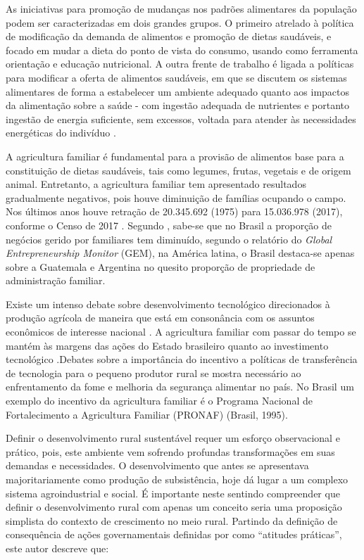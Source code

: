 As iniciativas para promoção de mudanças nos padrões alimentares da população podem ser caracterizadas em dois grandes grupos. O primeiro atrelado à política de modificação da demanda de alimentos e promoção de dietas saudáveis, e focado em mudar a dieta do ponto de vista do consumo, usando como ferramenta orientação e educação nutricional. A outra frente de trabalho é ligada a políticas para modificar a oferta de alimentos saudáveis, em que se discutem os sistemas alimentares de forma a estabelecer um ambiente adequado quanto aos impactos da alimentação sobre a saúde - com ingestão adequada de nutrientes e portanto ingestão de energia suficiente, sem excessos, voltada para atender às necessidades energéticas do indivíduo \cite{maia_padroes_2018}.

A agricultura familiar é fundamental para a provisão de alimentos base para a constituição de dietas saudáveis, tais como legumes, frutas, vegetais e de origem animal. Entretanto, a agricultura familiar tem apresentado resultados gradualmente negativos, pois houve diminuição de famílias ocupando o campo. Nos últimos anos houve retração de 20.345.692 (1975) para 15.036.978 (2017), conforme o Censo de 2017 \cite{ibge_censo_2018}. Segundo , sabe-se que no Brasil a proporção de negócios gerido por familiares tem diminuído, segundo o relatório do \textit{Global Entrepreneurship Monitor} (GEM), na América latina, o Brasil destaca-se apenas sobre a Guatemala e Argentina no quesito proporção de propriedade de administração familiar. 

Existe um intenso debate sobre desenvolvimento tecnológico direcionados à produção agrícola de maneira que está  em consonância com os assuntos econômicos de interesse nacional \cite{lopes_visao_2014}. A agricultura familiar com passar do tempo se mantém às margens das ações do Estado brasileiro quanto ao investimento tecnológico  \cite{beatriz_propriedade_2015}.Debates sobre a importância do incentivo a políticas de transferência de tecnologia para o pequeno produtor rural se mostra necessário ao enfrentamento da fome e melhoria da segurança alimentar no país. No Brasil um exemplo do incentivo da agricultura familiar é o Programa Nacional de Fortalecimento a Agricultura Familiar (PRONAF) (Brasil, 1995).


Definir o desenvolvimento rural sustentável requer um esforço observacional e prático, pois, este ambiente vem sofrendo profundas transformações em suas demandas e necessidades. O desenvolvimento que antes se apresentava majoritariamente como produção de subsistência, hoje dá lugar a um complexo sistema agroindustrial \cite{bastos_determinantes_2018} e social. É importante neste sentindo compreender que definir o desenvolvimento rural com apenas um conceito seria uma proposição simplista do contexto de crescimento no meio rural. Partindo da definição de consequência de ações governamentais definidas por  como “atitudes práticas”, este autor descreve que:

